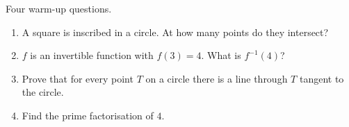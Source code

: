 Four warm-up questions.
\begin{enumerate}
\item A square is inscribed in a circle. At how many points do they intersect?
\item $f$ is an invertible function with $f(3)=4$. What is $f^{-1}(4)$?
\item Prove that for every point $T$ on a circle there is a line through $T$ tangent to the circle.
\item Find the prime factorisation of $4$.
\end{enumerate}
